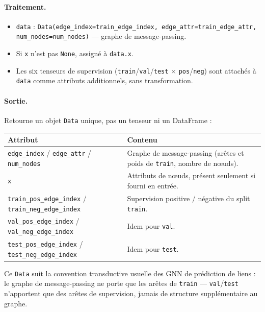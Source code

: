 \documentclass[11pt,a4paper]{article}
\newcommand{\code}[1]{\texttt{\small #1}}
\begin{document}
\paragraph{Traitement.}
\begin{itemize}[nosep,leftmargin=*]
  \item \code{data} : \code{Data(edge\_index=train\_edge\_index,
        edge\_attr=train\_edge\_attr, num\_nodes=num\_nodes)} --- graphe de
        message-passing.
  \item Si \code{x} n'est pas \code{None}, assigné à \code{data.x}.
  \item Les six tenseurs de supervision (\code{train}/\code{val}/\code{test}
        $\times$ \code{pos}/\code{neg}) sont attachés à \code{data} comme
        attributs additionnels, sans transformation.
\end{itemize}

\paragraph{Sortie.}
Retourne un objet \code{Data} unique, pas un tenseur ni un DataFrame :
\begin{center}
\small
\begin{tabular}{@{}p{5.0cm}p{8.6cm}@{}}
\toprule
\textbf{Attribut} & \textbf{Contenu} \\
\midrule
\code{edge\_index} / \code{edge\_attr} / \code{num\_nodes} & Graphe de
  message-passing (arêtes et poids de \code{train}, nombre de nœuds). \\
\code{x} & Attributs de nœuds, présent seulement si fourni en entrée. \\
\code{train\_pos\_edge\_index} / \code{train\_neg\_edge\_index} & Supervision
  positive / négative du split \code{train}. \\
\code{val\_pos\_edge\_index} / \code{val\_neg\_edge\_index} & Idem pour
  \code{val}. \\
\code{test\_pos\_edge\_index} / \code{test\_neg\_edge\_index} & Idem pour
  \code{test}. \\
\bottomrule
\end{tabular}
\end{center}
Ce \code{Data} suit la convention transductive usuelle des GNN de prédiction de
liens : le graphe de message-passing ne porte que les arêtes de \code{train}
--- \code{val}/\code{test} n'apportent que des arêtes de supervision, jamais de
structure supplémentaire au graphe.
\end{document}

